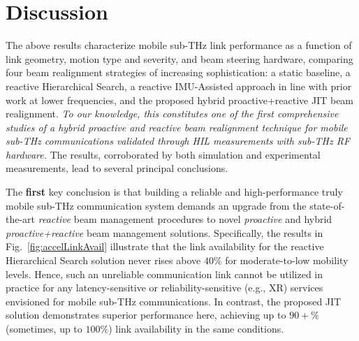 \documentclass[fleqn,10pt]{wlscirep}
\begin{document}
\section*{Discussion}

The above results characterize mobile sub-THz link performance as a function of link geometry, motion type and severity, and beam steering hardware, comparing four beam realignment strategies of increasing sophistication: a static baseline, a reactive Hierarchical Search, a reactive IMU-Assisted approach in line with prior work at lower frequencies\cite{s141019622, Brambilla_2019}, and the proposed hybrid proactive+reactive JIT beam realignment. \emph{To our knowledge, this constitutes one of the first comprehensive studies of a hybrid proactive and reactive beam realignment technique for mobile sub-THz communications validated through HIL measurements with sub-THz RF hardware.} The results, corroborated by both simulation and experimental measurements, lead to several principal conclusions.

The \textbf{first} key conclusion is that building a reliable and high-performance truly mobile sub-THz communication system demands an upgrade from the state-of-the-art \emph{reactive} beam management procedures to novel \emph{proactive} and hybrid \emph{proactive+reactive} beam management solutions. Specifically, the results in Fig.~\ref{fig:accelLinkAvail} illustrate that the link availability for the reactive Hierarchical Search solution never rises above $40\%$ for moderate-to-low mobility levels. Hence, such an unreliable communication link cannot be utilized in practice for any latency-sensitive or reliability-sensitive (e.g., XR) services envisioned for mobile sub-THz communications. In contrast, the proposed JIT solution demonstrates superior performance here, achieving up to $90+\%$ (sometimes, up to $100\%$) link availability in the same conditions.
\end{document}
